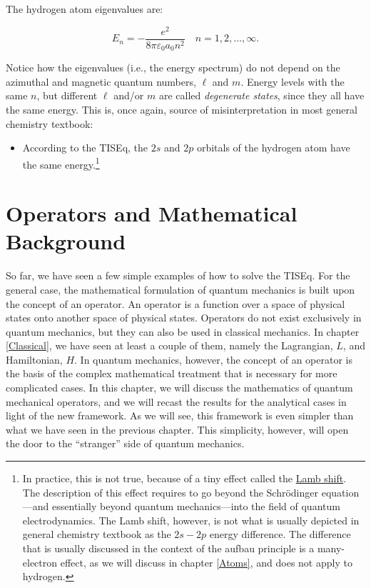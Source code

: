 \documentclass[
  9pt,
]{extbook}
\providecommand{\tightlist}{%
  \setlength{\itemsep}{0pt}\setlength{\parskip}{0pt}}
\theoremstyle{definition}
\theoremstyle{definition}
\theoremstyle{definition}
\theoremstyle{remark}
\begin{document}
The hydrogen atom eigenvalues are:

\begin{equation}
E_n = - \frac{e^2}{8 \pi \varepsilon_0 a_0 n^2} \quad n=1,2,\ldots,\infty.
\label{eq:HA7}
\end{equation}

Notice how the eigenvalues (i.e., the energy spectrum) do not depend on the azimuthal and magnetic quantum numbers, \(\ell\) and \(m\). Energy levels with the same \(n\), but different \(\ell\) and/or \(m\) are called \emph{degenerate states}, since they all have the same energy. This is, once again, source of misinterpretation in most general chemistry textbook:

\begin{itemize}
\tightlist
\item
  According to the TISEq, the \(2s\) and \(2p\) orbitals of the hydrogen atom have the same energy.\footnote{In practice, this is not true, because of a tiny effect called the \href{https://en.wikipedia.org/wiki/Lamb_shift}{Lamb shift}. The description of this effect requires to go beyond the Schrödinger equation---and essentially beyond quantum mechanics---into the field of quantum electrodynamics. The Lamb shift, however, is not what is usually depicted in general chemistry textbook as the \(2s-2p\) energy difference. The difference that is usually discussed in the context of the aufbau principle is a many-electron effect, as we will discuss in chapter \ref{Atoms}, and does not apply to hydrogen.}
\end{itemize}

\hypertarget{Operators}{%
\chapter{Operators and Mathematical Background}\label{Operators}}

So far, we have seen a few simple examples of how to solve the TISEq. For the general case, the mathematical formulation of quantum mechanics is built upon the concept of an operator. An operator is a function over a space of physical states onto another space of physical states. Operators do not exist exclusively in quantum mechanics, but they can also be used in classical mechanics. In chapter \ref{Classical}, we have seen at least a couple of them, namely the Lagrangian, \(L\), and Hamiltonian, \(H\). In quantum mechanics, however, the concept of an operator is the basis of the complex mathematical treatment that is necessary for more complicated cases. In this chapter, we will discuss the mathematics of quantum mechanical operators, and we will recast the results for the analytical cases in light of the new framework. As we will see, this framework is even simpler than what we have seen in the previous chapter. This simplicity, however, will open the door to the ``stranger'' side of quantum mechanics.
\end{document}
